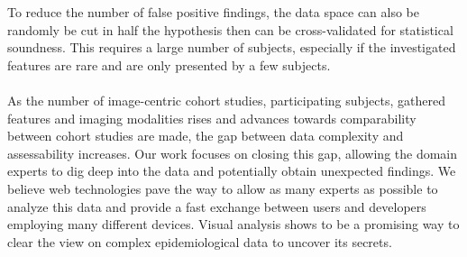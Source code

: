 \documentclass[journal]{style/vgtc} 			          %
\begin{document}
To reduce the number of false positive findings, the data space can also be randomly be cut in half the hypothesis then can be cross-validated for statistical soundness.
%
This requires a large number of subjects, especially if the investigated features are rare and are only presented by a few subjects.
%
\\\\
As the number of image-centric cohort studies, participating subjects, gathered features and imaging modalities rises and advances towards comparability between cohort studies are made, the gap between data complexity and assessability increases.
%
Our work focuses on closing this gap, allowing the domain experts to dig deep into the data and potentially obtain unexpected findings.
%
We believe web technologies pave the way to allow as many experts as possible to analyze this data and provide a fast exchange between users and developers employing many different devices.
%
Visual analysis shows to be a promising way to clear the view on complex epidemiological data to uncover its secrets.





\end{document}
